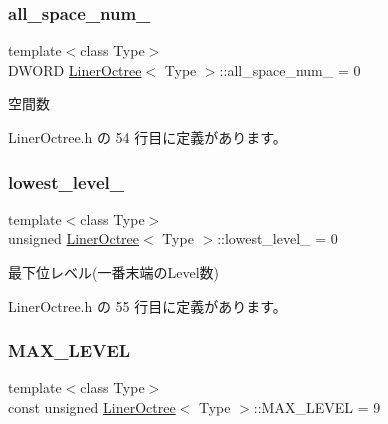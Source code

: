\subsubsection{\texorpdfstring{all\+\_\+space\+\_\+num\+\_\+}{all\_space\_num\_}}
{\footnotesize\ttfamily template$<$class Type$>$ \\
D\+W\+O\+RD \mbox{\hyperlink{class_liner_octree}{Liner\+Octree}}$<$ Type $>$\+::all\+\_\+space\+\_\+num\+\_\+ = 0\hspace{0.3cm}{\ttfamily [private]}}



空間数 



 Liner\+Octree.\+h の 54 行目に定義があります。

\mbox{\label{class_liner_octree_aa62a6ad34ceed4a8fef93123ca45350d}} 
\subsubsection{\texorpdfstring{lowest\+\_\+level\+\_\+}{lowest\_level\_}}
{\footnotesize\ttfamily template$<$class Type$>$ \\
unsigned \mbox{\hyperlink{class_liner_octree}{Liner\+Octree}}$<$ Type $>$\+::lowest\+\_\+level\+\_\+ = 0\hspace{0.3cm}{\ttfamily [private]}}



最下位レベル(一番末端の\+Level数) 



 Liner\+Octree.\+h の 55 行目に定義があります。

\mbox{\label{class_liner_octree_aced865f2822181486eb805e4db1f0a32}} 
\subsubsection{\texorpdfstring{M\+A\+X\+\_\+\+L\+E\+V\+EL}{MAX\_LEVEL}}
{\footnotesize\ttfamily template$<$class Type$>$ \\
const unsigned \mbox{\hyperlink{class_liner_octree}{Liner\+Octree}}$<$ Type $>$\+::M\+A\+X\+\_\+\+L\+E\+V\+EL = 9\hspace{0.3cm}{\ttfamily [static]}}



